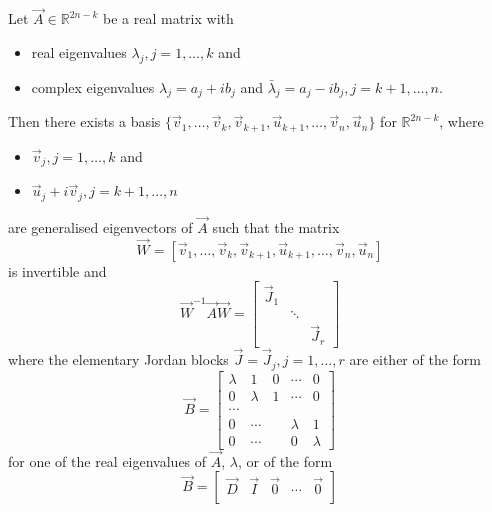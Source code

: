 \begin{theorem} %
	\label{thm:la:jordan}
	Let $\vec A \in \mathbb R^{2n - k}$ be a real matrix with
	\begin{itemize}
		\item real eigenvalues $\lambda_j, j = 1, \dotsc, k$ and
		\item complex eigenvalues $\lambda_j = a_j + ib_j$ and $\bar \lambda_j = a_j - ib_j, j = k + 1, \dotsc, n$.
	\end{itemize}
	Then there exists a basis $\{\vec v_1, \dotsc, \vec v_k, \vec v_{k + 1}, \vec u_{k + 1}, \dotsc, \vec v_n, \vec u_n\}$ for $\mathbb R^{2n - k}$, where
	\begin{itemize}
		\item $\vec v_j, j = 1, \dotsc, k$ and
		\item $\vec u_j + i\vec v_j, j = k + 1, \dotsc, n$
	\end{itemize}
	are generalised eigenvectors of $\vec A$ such that the matrix
	\begin{equation*}
		\vec W = [\vec v_1, \dotsc, \vec v_k, \vec v_{k + 1}, \vec u_{k + 1}, \dotsc, \vec v_n, \vec u_n]
	\end{equation*}
	is invertible and
	\begin{equation}
		\vec W^{-1} \vec A \vec W =
		\begin{bmatrix}
			\vec J_1 	& 			& \\
						& \ddots 	& \\
						&			& \vec J_r
		\end{bmatrix}
	\end{equation}
	where the elementary Jordan blocks $\vec J = \vec J_j, j = 1, \dotsc, r$ are either of the form
	\begin{equation}
		\vec B =
		\begin{bmatrix}
			\lambda & 1 		& 0 & \cdots 	& 0 \\
			0 		& \lambda 	& 1 & \cdots 	& 0 \\
			\cdots 	&			&	&		 	& \\
			0 		& \cdots 	& 	& \lambda 	& 1 \\
			0 		& \cdots	&	& 0 		& \lambda
		\end{bmatrix}
	\end{equation}
	for one of the real eigenvalues of $\vec A$, $\lambda$, or of the form
	\begin{equation}
		\vec B =
		\begin{bmatrix}
			\vec D 	& \vec I	& \vec 0 	& \cdots 	& \vec 0 \\

\end{bmatrix}
\end{equation}
\end{theorem}
